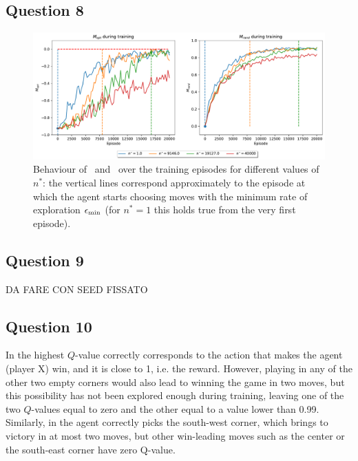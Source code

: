 \documentclass[10pt]{IEEEtran}
\begin{document}
\subsection*{Question 8}
\begin{figure}[H]
    \centering
    \includegraphics[width=\linewidth]{code/figures/performance_n_star_self.pdf}
    \caption{Behaviour of \mopt\ and \mrand\ over the training episodes for different values of $n^*$:  the vertical lines correspond approximately to the episode at which the agent starts choosing moves with the minimum rate of exploration $\epsilon_{\text{min}}$ (for $n^{*} = 1$ this holds true from the very first episode).}
    \label{plot_question8}
\end{figure}



\subsection*{Question 9}
DA FARE CON SEED FISSATO

\subsection*{Question 10}
In  the highest $Q$-value correctly corresponds to the action that makes the agent (player X) win, and it is close to 1, i.e. the reward. However, playing in any of the other two empty corners would also lead to winning the game in two moves, but this possibility has not been explored enough during training, leaving one of the two  $Q$-values equal to zero and the other equal to a value lower than 0.99. Similarly, in  the agent correctly picks the south-west corner, which brings to victory in at most two moves, but other win-leading moves such as the center or the south-east corner have zero Q-value.
\end{document}
